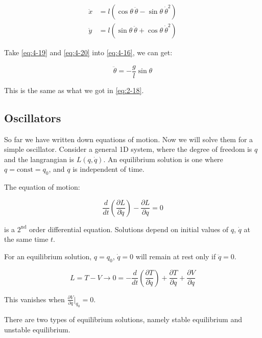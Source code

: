 \begin{align}
    \label{eq:4-19}
    \ddot{x} &= l\left(\cos \theta \ \ddot{\theta} - \sin \theta \ \dot{\theta}^2\right) \\
    \label{eq:4-20}
    \ddot{y} &= l\left(\sin \theta \ \ddot{\theta} + \cos \theta \ \dot{\theta}^2\right)
\end{align}

Take \ref{eq:4-19} and \ref{eq:4-20} into \ref{eq:4-16}, we can get:

\begin{equation}
    \ddot{\theta} = -\frac{g}{l} \sin \theta
\end{equation}

This is the same as what we got in \ref{eq:2-18}.

\subsection{Oscillators}

So far we have written down equations of motion. Now we will solve them for a simple oscillator. Consider a general 1D system, where the degree of freedom is $q$ and the langrangian is $L\left(q, \dot{q}\right)$. An equilibrium solution is one where $q = \text{const} = q_0$, and $q$ is independent of time.

The equation of motion:

\begin{equation}
    \frac{d}{dt} \left(\frac{\partial L}{\partial \dot{q}}\right) - \frac{\partial L}{\partial q} = 0
\end{equation}

is a $2^\text{nd}$ order differential equation. Solutions depend on initial values of $q$, $\dot{q}$ at the same time $t$.

For an equilibrium solution, $q = q_0$, $\dot{q} = 0$ will remain at rest only if $\ddot{q} = 0$.

\begin{equation}
    L = T - V \rightarrow 0 = - \frac{d}{dt} \left(\frac{\partial T}{\partial \dot{q}}\right) + \frac{\partial T}{\partial q} + \frac{\partial V}{\partial q}
\end{equation}

This vanishes when $\frac{\partial V}{\partial q} \big |_{q_0} = 0$.

There are two types of equilibrium solutions, namely stable equilibrium and unstable equilibrium. 
